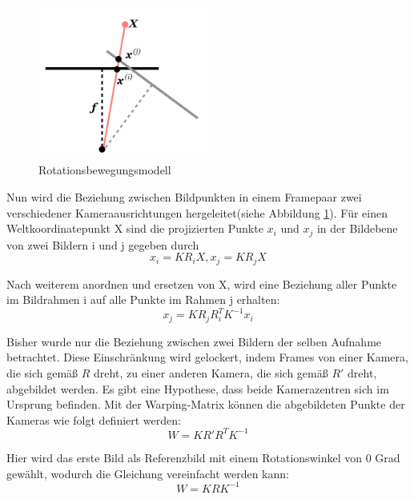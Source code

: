 \begin{figure}[H]
 \centering 
 \includegraphics[keepaspectratio,width=0.5\textwidth]{images/3_Ersteverfahren/Kamera/rotationsmodel.pdf}
 \caption{Rotationsbewegungsmodell}
 \label{fig:rotationsmodel}
\end{figure} 

Nun wird die Beziehung zwischen Bildpunkten in einem Framepaar zwei verschiedener Kameraausrichtungen hergeleitet(siehe Abbildung \ref{fig:rotationsmodel}). Für einen Weltkoordinatepunkt X sind die projizierten Punkte $x_i$ und $x_j$ in der Bildebene von zwei Bildern i und j gegeben durch
\begin{equation}
   x_i = KR_iX, x_j = KR_jX
\end{equation}

Nach weiterem anordnen und ersetzen von X, wird eine Beziehung aller Punkte im Bildrahmen i auf alle Punkte im Rahmen j erhalten:
\begin{equation}
   x_j = KR_jR_i^TK^{-1}x_i
\end{equation}

Bisher wurde nur die Beziehung zwischen zwei Bildern der selben Aufnahme betrachtet. Diese Einschränkung wird gelockert, indem Frames von einer Kamera, die sich gemäß $R$ dreht, zu einer anderen Kamera, die sich gemäß $R'$ dreht, abgebildet werden. Es gibt eine Hypothese, dass beide Kamerazentren sich im Ursprung befinden. Mit der Warping-Matrix können die abgebildeten Punkte der Kameras wie folgt definiert werden:
\begin{equation}
   W = KR'R^TK^{-1}
\end{equation}

Hier wird das erste Bild als Referenzbild mit einem Rotationswinkel von 0 Grad gewählt, wodurch die Gleichung vereinfacht werden kann:
\begin{equation}
   W = KRK^{-1}
\end{equation}


